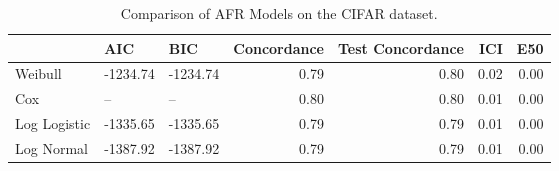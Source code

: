 \begin{table*}
\centering
\caption{Comparison of AFR Models on the CIFAR dataset.}
\label{tab:cifar}
\begin{tabular}{lllrrrr}
\toprule
 & AIC & BIC & Concordance & Test Concordance & ICI & E50 \\
\midrule
Weibull & -1234.74 & -1234.74 & 0.79 & 0.80 & 0.02 & 0.00 \\
Cox & -- & -- & 0.80 & 0.80 & 0.01 & 0.00 \\
Log Logistic & -1335.65 & -1335.65 & 0.79 & 0.79 & 0.01 & 0.00 \\
Log Normal & -1387.92 & -1387.92 & 0.79 & 0.79 & 0.01 & 0.00 \\
\bottomrule
\end{tabular}
\end{table*}
